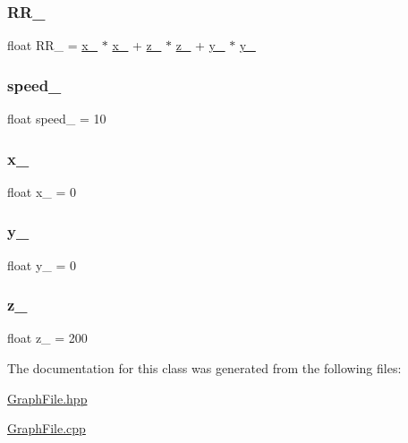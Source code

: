 \subsubsection{\texorpdfstring{R\+R\+\_\+}{RR\_}}
{\footnotesize\ttfamily float R\+R\+\_\+ = \hyperlink{classmouse__t_a902ac86b499a19c0cd4405d18bf03551}{x\+\_\+} $\ast$ \hyperlink{classmouse__t_a902ac86b499a19c0cd4405d18bf03551}{x\+\_\+} + \hyperlink{classmouse__t_a42626aabbe4860f2e6bb5e0e840c8e1d}{z\+\_\+} $\ast$ \hyperlink{classmouse__t_a42626aabbe4860f2e6bb5e0e840c8e1d}{z\+\_\+} + \hyperlink{classmouse__t_ac026f8fee6095db0f1867db5c250b83f}{y\+\_\+} $\ast$ \hyperlink{classmouse__t_ac026f8fee6095db0f1867db5c250b83f}{y\+\_\+}}

\mbox{\label{classmouse__t_a6bcf637aa4f03937954c7e26c6123c7c}} 
\subsubsection{\texorpdfstring{speed\+\_\+}{speed\_}}
{\footnotesize\ttfamily float speed\+\_\+ = 10}

\mbox{\label{classmouse__t_a902ac86b499a19c0cd4405d18bf03551}} 
\subsubsection{\texorpdfstring{x\+\_\+}{x\_}}
{\footnotesize\ttfamily float x\+\_\+ = 0}

\mbox{\label{classmouse__t_ac026f8fee6095db0f1867db5c250b83f}} 
\subsubsection{\texorpdfstring{y\+\_\+}{y\_}}
{\footnotesize\ttfamily float y\+\_\+ = 0}

\mbox{\label{classmouse__t_a42626aabbe4860f2e6bb5e0e840c8e1d}} 
\subsubsection{\texorpdfstring{z\+\_\+}{z\_}}
{\footnotesize\ttfamily float z\+\_\+ = 200}



The documentation for this class was generated from the following files\+:\begin{DoxyCompactItemize}
\item 
\hyperlink{GraphFile_8hpp}{Graph\+File.\+hpp}\item 
\hyperlink{GraphFile_8cpp}{Graph\+File.\+cpp}\end{DoxyCompactItemize}
